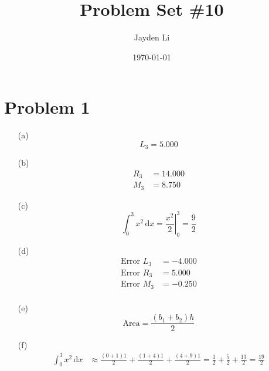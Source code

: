 \documentclass[preview, margin=0.6in]{standalone}
\title{\vspace*{-30pt}Problem Set \#10}
\author{Jayden Li}
\date{\today}
\newcommand*{\problem}[1]{\section*{Problem #1}}
\begin{document}
\fontsize{12pt}{12pt}\selectfont
\setlength{\abovedisplayskip}{0pt}
\maketitle
\problem{1}
\begin{itemize}
	\item[(a)]
		\begin{equation*}
			L_3=5.000
		\end{equation*}
	\item[(b)]
		\begin{align*}
			R_3&=14.000 \\ 
			M_3&=8.750
		\end{align*}
	\item[(c)]
		\begin{equation*}
		    \int_{0}^{3}x^2\,\mathrm{d}x=\left.\frac{x^2}{2}\right|_{0}^{3}=\frac{9}{2}
		\end{equation*}
	\item[(d)]
		\begin{align*}
			\text{Error }L_3&=-4.000 \\
			\text{Error }R_3&=5.000 \\
			\text{Error }M_3&=-0.250 \\
		\end{align*}
	\item[(e)]
		\begin{equation*}
			\text{Area}=\frac{\left(b_1+b_2\right)h}{2}
		\end{equation*}
	\item[(f)]
		\begin{align*}
		    \int_{0}^{3}x^2\,\mathrm{d}x
			&\approx \frac{(0+1)1}{2}+\frac{(1+4)1}{2}+\frac{(4+9)1}{2}
			=\frac{1}{2}+\frac{5}{2}+\frac{13}{2}
			=\frac{19}{2}
		\end{align*}
\end{itemize}
\end{document}
